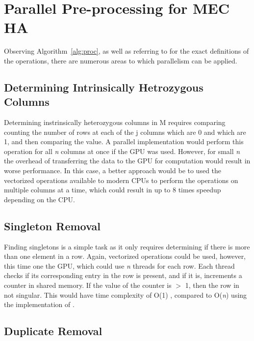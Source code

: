 \documentclass[10pt,a4paer,twocolumn]{article}
\begin{document}

\section{ Parallel Pre-processing for MEC HA } \label{sec:parpre}

Observing Algorithm~\ref{alg:proc}, as well as referring to \cite{chen:2013} for the exact definitions of the
operations, there are numerous areas to which parallelism can be applied.

\subsection{ Determining Intrinsically Hetrozygous Columns}

Determining instrinsically heterozygous columns in M requires comparing counting the number of rows at each of
the j columns which are 0 and which are 1, and then comparing the value. A parallel implementation would
perform this operation for all \textit{n} columns at once if the GPU was used. However, for small \textit{n}
the overhead of transferring the data to the GPU for computation would result in worse performance. In this
case, a better approach would be to used the vectorized operations available to modern CPUs to perform the
operations on multiple columns at a time, which could result in up to 8 times speedup depending on the CPU.

\subsection{Singleton Removal}

Finding singletons is a simple task as it only requires determining if there is more than one element in a
row. Again, vectorized operations could be used, however, this time one the GPU, which could use \textit{n}
threads for each row. Each thread checks if its corresponding entry in the row is present, and if it is,
increments a counter in shared memory. If the value of the counter is $>$ 1, then the row in not singular.
This would have time complexity of O(1) , compared to O(\textit{n}) using the implementation of
\cite{chen:2013}.

\subsection{Duplicate Removal}
\end{document}

